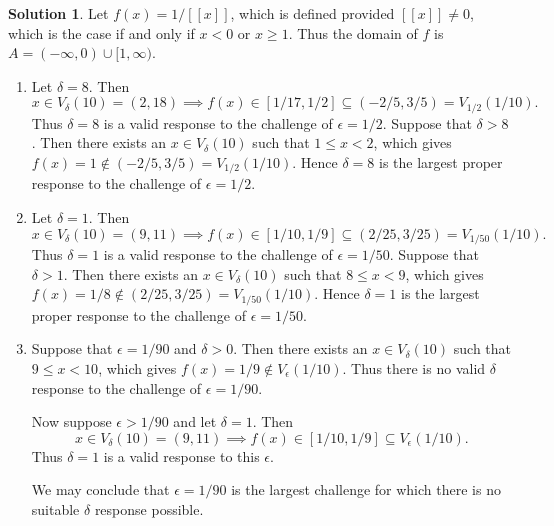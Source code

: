 \documentclass[12pt]{article}
\theoremstyle{definition}
\theoremstyle{exercise}
\theoremstyle{solution}
\newtheorem*{solution}{Solution}
\begin{document}
\begin{solution}
    Let \( f(x) = 1/[[x]] \), which is defined provided \( [[x]] \neq 0 \), which is the case if and only if \( x < 0 \) or \( x \geq 1 \). Thus the domain of \( f \) is \( A = (-\infty, 0) \cup [1, \infty) \).
    \begin{enumerate}
        \item Let \( \delta = 8 \). Then
        \[
            x \in V_{\delta}(10) = (2, 18) \implies f(x) \in [1/17, 1/2] \subseteq (-2/5, 3/5) = V_{1/2}(1/10).
        \]
        Thus \( \delta = 8 \) is a valid response to the challenge of \( \epsilon = 1/2 \). Suppose that \( \delta > 8 \). Then there exists an \( x \in V_{\delta}(10) \) such that \( 1 \leq x < 2 \), which gives \( f(x) = 1 \not\in (-2/5, 3/5) = V_{1/2}(1/10) \). Hence \( \delta = 8 \) is the largest proper response to the challenge of \( \epsilon = 1/2 \).

        \item Let \( \delta = 1 \). Then
        \[
            x \in V_{\delta}(10) = (9, 11) \implies f(x) \in [1/10, 1/9] \subseteq (2/25, 3/25) = V_{1/50}(1/10).
        \]
        Thus \( \delta = 1 \) is a valid response to the challenge of \( \epsilon = 1/50 \). Suppose that \( \delta > 1 \). Then there exists an \( x \in V_{\delta}(10) \) such that \( 8 \leq x < 9 \), which gives \( f(x) = 1/8 \not\in (2/25, 3/25) = V_{1/50}(1/10) \). Hence \( \delta = 1 \) is the largest proper response to the challenge of \( \epsilon = 1/50 \).

        \item Suppose that \( \epsilon = 1/90 \) and \( \delta > 0 \). Then there exists an \( x \in V_{\delta}(10) \) such that \( 9 \leq x < 10 \), which gives \( f(x) = 1/9 \not\in V_{\epsilon}(1/10) \). Thus there is no valid \( \delta \) response to the challenge of \( \epsilon = 1/90 \).
        
        Now suppose \( \epsilon > 1/90 \) and let \( \delta = 1 \). Then
        \[
            x \in V_{\delta}(10) = (9, 11) \implies f(x) \in [1/10, 1/9] \subseteq V_{\epsilon}(1/10).
        \]
        Thus \( \delta = 1 \) is a valid response to this \( \epsilon \).

        We may conclude that \( \epsilon = 1/90 \) is the largest challenge for which there is no suitable \( \delta \) response possible.
    \end{enumerate}
\end{solution}
\end{document}
